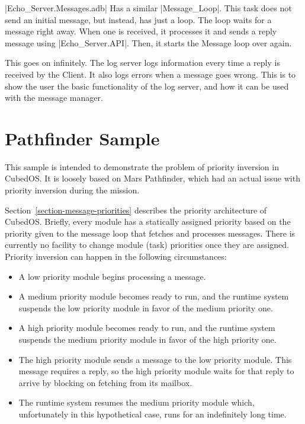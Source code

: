|Echo_Server.Messages.adb| Has a similar |Message_Loop|. This task does not send an initial
message, but instead, has just a loop. The loop waits for a message right away. When one is
received, it processes it and sends a reply message using |Echo_Server.API|. Then, it starts the
Message loop over again. 

This goes on infinitely. The log server logs information every time a reply is received by the
Client. It also logs errors when a message goes wrong. This is to show the user the basic
functionality of the log server, and how it can be used with the message manager.


\section{Pathfinder Sample}
\label{sec:pathfinder-sample}

This sample is intended to demonstrate the problem of priority inversion in CubedOS. It is
loosely based on Mars Pathfinder, which had an actual issue with priority inversion during the
mission.

Section~\ref{section-message-priorities} describes the priority architecture of CubedOS.
Briefly, every module has a statically assigned priority based on the priority given to the
message loop that fetches and processes messages. There is currently no facility to change
module (task) priorities once they are assigned. Priority inversion can happen in the following
circumstances:

\begin{itemize}

\item A low priority module begins processing a message.

\item A medium priority module becomes ready to run, and the runtime system suspends the low
priority module in favor of the medium priority one.

\item A high priority module becomes ready to run, and the runtime system suspends the medium
priority module in favor of the high priority one.

\item The high priority module sends a message to the low priority module. This message requires
a reply, so the high priority module waits for that reply to arrive by blocking on fetching from
its mailbox.

\item The runtime system resumes the medium priority module which, unfortunately in this
hypothetical case, runs for an indefinitely long time.

\end{itemize}


